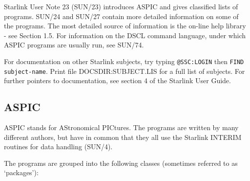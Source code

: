 Starlink User Note 23 (SUN/23)
introduces ASPIC and gives classified lists of programs.
SUN/24 and SUN/27 contain more detailed information on some of the programs.
The most detailed source of information is the on-line help library
- see Section 1.5.
For information on the DSCL command language,
under which ASPIC programs are usually run,
see SUN/74.

For documentation on other Starlink subjects, try typing
{\tt @SSC:LOGIN}
then {\tt FIND subject-name}.
Print file DOCSDIR:SUBJECT.LIS
for a full list of subjects.
For further pointers to documentation,
see section 4 of the Starlink User Guide.

\subsection {ASPIC}

ASPIC stands for AStronomical PICtures.
The programs are written by many different authors, but have in common that they all use the Starlink INTERIM
routines for data handling (SUN/4).

The programs are grouped into the following classes (sometimes referred to
as `packages'):

